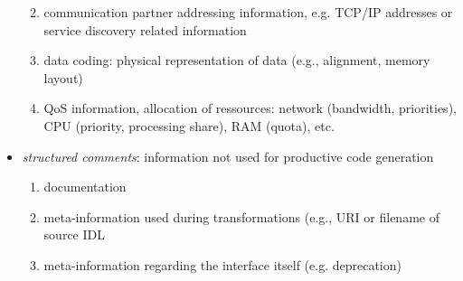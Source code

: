 \documentclass[a4paper,10pt]{scrreprt}
\newlength{\XdocItemIndent}
\begin{document}
\begin{itemize}
\begin{minipage}[t]{\XdocItemIndent}
\begin{enumerate}
\begin{minipage}[t]{\XdocItemIndent}
\end{minipage}
\item \begin{minipage}[t]{\XdocItemIndent}
communication partner addressing information,
				e.g. TCP/IP addresses or service discovery related information

\end{minipage}
\item \begin{minipage}[t]{\XdocItemIndent}
data coding: physical representation of data (e.g., alignment, memory layout)

\end{minipage}
\item \begin{minipage}[t]{\XdocItemIndent}
QoS information, allocation of ressources:
				network (bandwidth, priorities), CPU (priority, processing share),
				RAM (quota), etc.

\end{minipage}
\end{enumerate}
\addtolength{\XdocItemIndent}{2.5em}


\end{minipage}
\item \begin{minipage}[t]{\XdocItemIndent}
\textit{structured comments}: information not used for productive code generation
		\setlength{\XdocItemIndent}{\textwidth}
\begin{enumerate}
\addtolength{\XdocItemIndent}{-2.5em}
\item \begin{minipage}[t]{\XdocItemIndent}
documentation

\end{minipage}
\item \begin{minipage}[t]{\XdocItemIndent}
meta-information used during transformations
				(e.g., URI or filename of source IDL

\end{minipage}
\item \begin{minipage}[t]{\XdocItemIndent}
meta-information regarding the interface itself (e.g. deprecation)

\end{minipage}
\end{enumerate}
\addtolength{\XdocItemIndent}{2.5em}


\end{minipage}
\end{itemize}
\addtolength{\XdocItemIndent}{2.5em}
\end{document}
